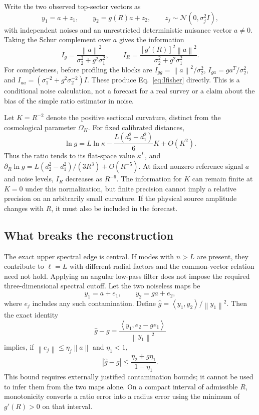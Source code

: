 \documentclass[aps,prd,reprint,amsmath,amssymb,nofootinbib,
longbibliography]{revtex4-2}
\newcommand{\norm}[1]{\left\lVert#1\right\rVert}
\newcommand{\ip}[2]{\left\langle#1,#2\right\rangle}
\begin{document}
Write the two observed top-sector vectors as
\begin{equation}
 y_1=a+z_1,\qquad y_2=g(R)a+z_2,
 \qquad z_j\sim\mathcal N(0,\sigma_j^2 I),
 \label{eq:twonoise}
\end{equation}
with independent noises and an unrestricted deterministic nuisance vector
$a\ne0$. Taking the Schur complement over $a$ gives the information
\begin{equation}
 I_g=\frac{\norm{a}^2}{\sigma_2^2+g^2\sigma_1^2},
 \qquad
 I_R=\frac{[g'(R)]^2\norm{a}^2}{\sigma_2^2+g^2\sigma_1^2}.
 \label{eq:Ifisher}
\end{equation}
For completeness, before profiling the blocks are
$I_{gg}=\norm{a}^2/\sigma_2^2$,
$I_{ga}=g a^T/\sigma_2^2$, and
$I_{aa}=(\sigma_1^{-2}+g^2\sigma_2^{-2})I$.
These produce Eq.~\eqref{eq:Ifisher} directly. This is a conditional
noise calculation, not a forecast for a real survey or a claim about
the bias of the simple ratio estimator in noise.

Let $K=R^{-2}$ denote the positive sectional curvature, distinct from
the cosmological parameter $\Omega_K$. For fixed calibrated distances,
\begin{equation}
 \ln g=L\ln\kappa-\frac{L(d_2^2-d_1^2)}6K+O(K^2).
 \label{eq:flat}
\end{equation}
Thus the ratio tends to its flat-space value $\kappa^L$, and
$\partial_R\ln g=L(d_2^2-d_1^2)/(3R^3)+O(R^{-5})$.
At fixed nonzero reference signal $a$ and noise levels, $I_R$ decreases
as $R^{-6}$. The information for $K$ can remain finite at $K=0$ under
this normalization, but finite precision cannot imply a relative
precision on an arbitrarily small curvature. If the physical source
amplitude changes with $R$, it must also be included in the forecast.

\subsection{What breaks the reconstruction}
\label{sec:leakage}

The exact upper spectral edge is central. If modes with $n>L$ are
present, they contribute to $\ell=L$ with different radial factors and
the common-vector relation need not hold. Applying an angular low-pass
filter does not impose the required three-dimensional spectral cutoff.
Let the two noiseless maps be
\begin{equation}
 y_1=a+e_1,\qquad y_2=g a+e_2,
\end{equation}
where $e_j$ includes any such contamination. Define
$\widehat g=\ip{y_1}{y_2}/\norm{y_1}^2$. Then the exact identity
\begin{equation}
 \widehat g-g=\frac{\ip{y_1}{e_2-ge_1}}{\norm{y_1}^2}
\end{equation}
implies, if $\norm{e_j}\leq\eta_j\norm{a}$ and $\eta_1<1$,
\begin{equation}
 |\widehat g-g|\leq\frac{\eta_2+g\eta_1}{1-\eta_1}.
 \label{eq:leakbound}
\end{equation}
This bound requires externally justified contamination bounds; it cannot
be used to infer them from the two maps alone. On a compact interval of
admissible $R$, monotonicity converts a ratio error into a radius error
using the minimum of $g'(R)>0$ on that interval.
\end{document}
